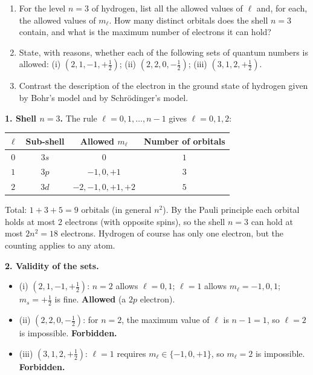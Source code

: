 \documentclass[11pt]{article}
\begin{document}
\begin{exoresolu}
\begin{enumerate}
\item For the level $n = 3$ of hydrogen, list all the allowed values of $\ell$ and, for each, the allowed values of $m_\ell$. How many distinct orbitals does the shell $n = 3$ contain, and what is the maximum number of electrons it can hold?
\item State, with reasons, whether each of the following sets of quantum numbers is allowed: (i) $(2, 1, -1, +\tfrac12)$; (ii) $(2, 2, 0, -\tfrac12)$; (iii) $(3, 1, 2, +\tfrac12)$.
\item Contrast the description of the electron in the ground state of hydrogen given by Bohr's model and by Schr\"odinger's model.
\end{enumerate}
\tcblower
\textbf{1. Shell $n = 3$.} The rule $\ell = 0, 1, \dots, n-1$ gives $\ell = 0, 1, 2$:
\begin{center}
\begin{tabular}{|c|c|c|c|}
\hline
\rowcolor{popblueL} $\ell$ & Sub-shell & Allowed $m_\ell$ & Number of orbitals \\
\hline
$0$ & $3s$ & $0$ & $1$ \\
\hline
$1$ & $3p$ & $-1, 0, +1$ & $3$ \\
\hline
$2$ & $3d$ & $-2, -1, 0, +1, +2$ & $5$ \\
\hline
\end{tabular}
\end{center}
Total: $1 + 3 + 5 = 9$ orbitals (in general $n^2$). By the Pauli principle each orbital holds at most 2 electrons (with opposite spins), so the shell $n = 3$ can hold at most $2n^2 = 18$ electrons. Hydrogen of course has only one electron, but the counting applies to any atom.

\textbf{2. Validity of the sets.}
\begin{itemize}
\item (i) $(2, 1, -1, +\tfrac12)$: $n = 2$ allows $\ell = 0, 1$; $\ell = 1$ allows $m_\ell = -1, 0, 1$; $m_s = +\tfrac12$ is fine. \textbf{Allowed} (a $2p$ electron).
\item (ii) $(2, 2, 0, -\tfrac12)$: for $n = 2$, the maximum value of $\ell$ is $n - 1 = 1$, so $\ell = 2$ is impossible. \textbf{Forbidden.}
\item (iii) $(3, 1, 2, +\tfrac12)$: $\ell = 1$ requires $m_\ell \in \{-1, 0, +1\}$, so $m_\ell = 2$ is impossible. \textbf{Forbidden.}
\end{itemize}


\end{exoresolu}
\end{document}
